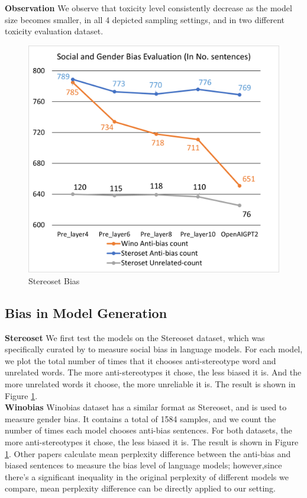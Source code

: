 \noindent \textbf{Observation} \quad We observe that toxicity level consistently decrease as the model size becomes smaller, in all 4 depicted sampling settings, and in two different toxicity evaluation dataset. 

\begin{figure}[ht!]
\includegraphics[scale = 0.57]{graphs/social_bias_2.png}
\caption{Stereoset Bias}
\centering
\label{fig: stereobias}
\end{figure}

\subsection{Bias in Model Generation}


\noindent \textbf{Stereoset} \quad We first test the models on the Stereoset dataset, which was specifically curated by \cite{Nadeem2021StereoSetMS} to measure social bias in language models. For each model, we plot the total number of times that it chooses anti-stereotype word and unrelated words. The more anti-stereotypes it chose, the less biased it is. And the more unrelated words it choose, the more unreliable it is. The result is shown in Figure \ref{fig: stereobias}.\\


\noindent \textbf{Winobias} \quad Winobias dataset has a similar format as Stereoset, and is used to measure gender bias. It contains a total of 1584 samples, and we count the number of times each model chooses anti-bias sentences. For both datasets, the more anti-stereotypes it chose, the less biased it is. The result is shown in Figure \ref{fig: stereobias}. Other papers \cite{Barikeri2021RedditBiasAR} calculate mean perplexity difference between the anti-bias and biased sentences to measure the bias level of language models; however,since there's a significant inequality in the original perplexity of different models we compare, mean perplexity difference can be directly applied to our setting. \\

